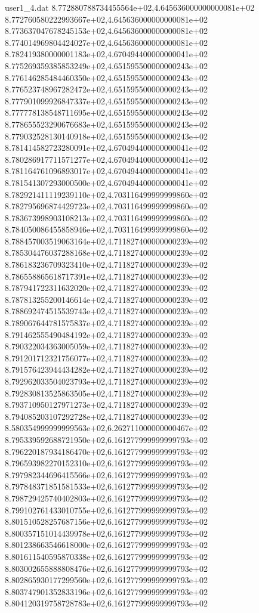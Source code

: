 \begin{filecontents}{user1_4.dat}
8.772880788734455564e+02,4.645636000000000081e+02
8.772760580222993667e+02,4.645636000000000081e+02
8.773637047678245153e+02,4.645636000000000081e+02
8.774014969804424027e+02,4.645636000000000081e+02
8.782419380000001183e+02,4.670494400000000041e+02
8.775269359385853249e+02,4.651595500000000243e+02
8.776146285484460350e+02,4.651595500000000243e+02
8.776523748967282472e+02,4.651595500000000243e+02
8.777901099926847337e+02,4.651595500000000243e+02
8.777778138548711695e+02,4.651595500000000243e+02
8.778655523290676683e+02,4.651595500000000243e+02
8.779032528130140918e+02,4.651595500000000243e+02
8.781414582723280091e+02,4.670494400000000041e+02
8.780286917711571277e+02,4.670494400000000041e+02
8.781164761096893017e+02,4.670494400000000041e+02
8.781541307293000500e+02,4.670494400000000041e+02
8.782921411119239110e+02,4.703116499999999860e+02
8.782795696874429723e+02,4.703116499999999860e+02
8.783673998903108213e+02,4.703116499999999860e+02
8.784050086455858946e+02,4.703116499999999860e+02
8.788457003519063164e+02,4.711827400000000239e+02
8.785304476037288168e+02,4.711827400000000239e+02
8.786183236709323410e+02,4.711827400000000239e+02
8.786558865618717391e+02,4.711827400000000239e+02
8.787941722311632020e+02,4.711827400000000239e+02
8.787813255200146614e+02,4.711827400000000239e+02
8.788692474515539743e+02,4.711827400000000239e+02
8.789067644781575837e+02,4.711827400000000239e+02
8.791462555490484192e+02,4.711827400000000239e+02
8.790322034363005059e+02,4.711827400000000239e+02
8.791201712321756077e+02,4.711827400000000239e+02
8.791576423944434282e+02,4.711827400000000239e+02
8.792962033504023793e+02,4.711827400000000239e+02
8.792830813525863505e+02,4.711827400000000239e+02
8.793710950127971273e+02,4.711827400000000239e+02
8.794085203107292728e+02,4.711827400000000239e+02
8.580354999999999563e+02,6.262711000000000467e+02
8.795339592688721950e+02,6.161277999999999793e+02
8.796220187934186470e+02,6.161277999999999793e+02
8.796593982270152310e+02,6.161277999999999793e+02
8.797982344696415566e+02,6.161277999999999793e+02
8.797848371851581533e+02,6.161277999999999793e+02
8.798729425740402803e+02,6.161277999999999793e+02
8.799102761433010755e+02,6.161277999999999793e+02
8.801510528257687156e+02,6.161277999999999793e+02
8.800357151014439978e+02,6.161277999999999793e+02
8.801238663546618000e+02,6.161277999999999793e+02
8.801611540595870338e+02,6.161277999999999793e+02
8.803002655888808476e+02,6.161277999999999793e+02
8.802865930177299560e+02,6.161277999999999793e+02
8.803747901352833196e+02,6.161277999999999793e+02
8.804120319758728783e+02,6.161277999999999793e+02

\end{filecontents}
